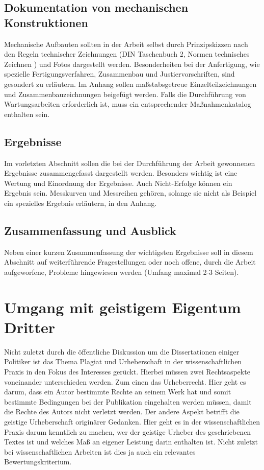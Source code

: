 \subsection{Dokumentation von mechanischen Konstruktionen}
Mechanische Aufbauten sollten in der Arbeit selbst durch Prinzipskizzen nach den Regeln technischer
Zeichnungen (DIN Taschenbuch 2, Normen technisches Zeichnen \cite{DIN_Norm_TZ}) und Fotos
dargestellt werden. Besonderheiten bei der Anfertigung, wie spezielle Fertigungsverfahren,
Zusammenbau und Justiervorschriften, sind gesondert zu erläutern. Im Anhang sollen maßstabsgetreue
Einzelteilzeichnungen und Zusammenbauzeichnungen beigefügt werden. Falls die Durchführung von
Wartungsarbeiten erforderlich ist, muss ein entsprechender Maßnahmenkatalog enthalten sein.

\subsection{Ergebnisse\label{sec:ergebnisse}}
Im vorletzten Abschnitt sollen die bei der Durchführung der Arbeit gewonnenen Ergebnisse
zusammengefasst dargestellt werden. Besonders wichtig ist eine Wertung und Einordnung der
Ergebnisse. Auch Nicht-Erfolge können ein Ergebnis sein. Messkurven und Messreihen gehören, solange
sie nicht als Beispiel ein spezielles Ergebnis erläutern, in den Anhang.

\subsection{Zusammenfassung und Ausblick}
Neben einer kurzen Zusammenfassung der wichtigsten Ergebnisse soll in diesem Abschnitt auf
weiterführende Fragestellungen oder noch offene, durch die Arbeit aufgeworfene, Probleme
hingewiesen werden (Umfang maximal 2-3 Seiten).


\section{Umgang mit geistigem Eigentum Dritter}

Nicht zuletzt durch die öffentliche Diskussion um die Dissertationen einiger Politiker ist das Thema Plagiat und Urheberschaft in der wissenschaftlichen Praxis in den Fokus des Interesses gerückt. Hierbei müssen zwei Rechtsaspekte voneinander unterschieden werden. Zum einen das Urheberrecht. Hier geht es darum, dass ein Autor bestimmte Rechte an seinem Werk hat und somit bestimmte Bedingungen bei der Publikation eingehalten werden müssen, damit die Rechte des Autors nicht verletzt werden.
Der andere Aspekt betrifft die geistige Urheberschaft originärer Gedanken. Hier geht es in der wissenschaftlichen Praxis darum kenntlich zu machen, wer der geistige Urheber des geschriebenen Textes ist und welches Maß an eigener Leistung darin enthalten ist. Nicht zuletzt bei wissenschaftlichen Arbeiten ist dies ja auch ein relevantes Bewertungskriterium. 

